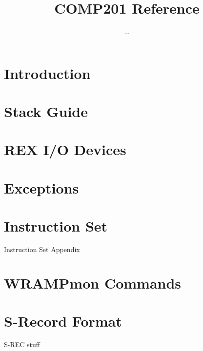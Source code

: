 \documentclass[a4paper]{book}
\title{COMP201 Reference}
\author{...}
\begin{document}
\maketitle
\tableofcontents

\chapter{Introduction}
\label{chapter:intro}

\chapter{Stack Guide}
\label{chapter:stack}

\chapter{REX I/O Devices}
\label{chapter:io}

\chapter{Exceptions}
\label{chapter:exceptions}

\appendix
\chapter{Instruction Set}
\label{appendix:instr}
%

Instruction Set Appendix 
\chapter{WRAMPmon Commands}
\label{appendix:wrampmon}

\chapter{S-Record Format}
\label{appendix:srec}
S-REC stuff
\end{document}
